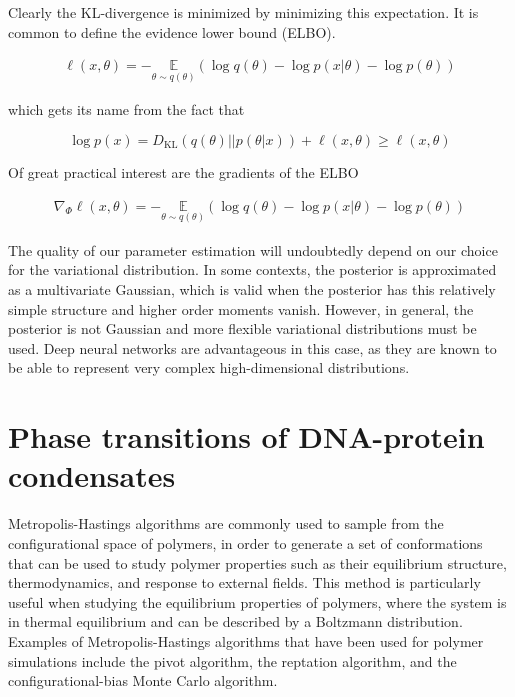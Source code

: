\documentclass{ucetd}
\begin{document}
Clearly the KL-divergence is minimized by minimizing this expectation. It is common to define the evidence lower bound (ELBO).

\begin{align}
\ell(x,\theta) = - \underset{{\theta \sim q(\theta)}}{\mathbb{E}}\left(\log q(\theta) - \log p(x|\theta) - \log p(\theta) \right)
\end{align}

which gets its name from the fact that

\begin{equation*}
\log p(x) = D_{\mathrm{KL}}(q(\theta)||p(\theta|x)) + \ell(x,\theta) \geq \ell(x,\theta)
\end{equation*}

Of great practical interest are the gradients of the ELBO

\begin{align*}
\nabla_{\Phi}\ell(x,\theta) = - \underset{{\theta \sim q(\theta)}}{\mathbb{E}}\left(\log q(\theta) - \log p(x|\theta) - \log p(\theta) \right)
\end{align*}

The quality of our parameter estimation will undoubtedly depend on our choice for the variational distribution. In some contexts, the posterior is approximated as a multivariate Gaussian, which is valid when the posterior has this relatively simple structure and higher order moments vanish. However, in general, the posterior is not Gaussian and more flexible variational distributions must be used. Deep neural networks are advantageous in this case, as they are known to be able to represent very complex high-dimensional distributions. 



\chapter{Phase transitions of DNA-protein condensates}

Metropolis-Hastings algorithms are commonly used to sample from the configurational space of polymers, in order to generate a set of conformations that can be used to study polymer properties such as their equilibrium structure, thermodynamics, and response to external fields. This method is particularly useful when studying the equilibrium properties of polymers, where the system is in thermal equilibrium and can be described by a Boltzmann distribution. Examples of Metropolis-Hastings algorithms that have been used for polymer simulations include the pivot algorithm, the reptation algorithm, and the configurational-bias Monte Carlo algorithm.
\end{document}
